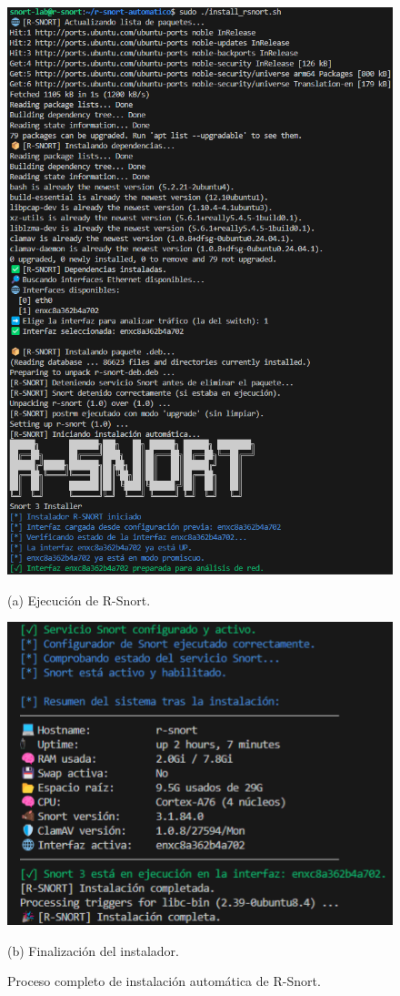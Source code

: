 \documentclass[11pt,a4paper,twoside]{report}
\begin{document}
\begin{figure}[H]
	\centering
	\begin{minipage}[b]{0.48\textwidth}
		\centering
		\includegraphics[scale=0.4]{script_automatico/14.png}
		\caption*{(a) Ejecución de R-Snort.}
	\end{minipage}
	\hfill
	\begin{minipage}[b]{0.48\textwidth}
		\centering
		\includegraphics[scale=0.4]{pruebas_config/10-10.png}
		\caption*{(b) Finalización del instalador.}
	\end{minipage}
	\caption{Proceso completo de instalación automática de R-Snort.}
\end{figure}
\end{document}
